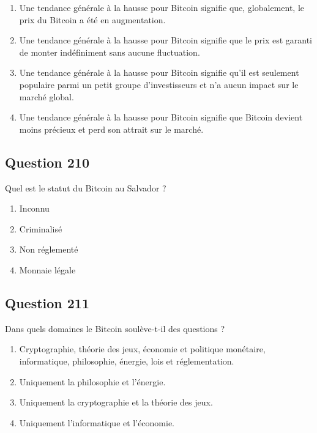 \documentclass[12pt,a4paper]{article}
\begin{document}
\begin{enumerate}[label=\Alph*., leftmargin=*]
\item Une tendance générale à la hausse pour Bitcoin signifie que, globalement, le prix du Bitcoin a été en augmentation.
\item Une tendance générale à la hausse pour Bitcoin signifie que le prix est garanti de monter indéfiniment sans aucune fluctuation.
\item Une tendance générale à la hausse pour Bitcoin signifie qu'il est seulement populaire parmi un petit groupe d'investisseurs et n'a aucun impact sur le marché global.
\item Une tendance générale à la hausse pour Bitcoin signifie que Bitcoin devient moins précieux et perd son attrait sur le marché.
\end{enumerate}

\bigskip


\subsection*{Question 210}
Quel est le statut du Bitcoin au Salvador ?

\begin{enumerate}[label=\Alph*., leftmargin=*]
\item Inconnu
\item Criminalisé
\item Non réglementé
\item Monnaie légale
\end{enumerate}

\bigskip


\subsection*{Question 211}
Dans quels domaines le Bitcoin soulève-t-il des questions ?

\begin{enumerate}[label=\Alph*., leftmargin=*]
\item Cryptographie, théorie des jeux, économie et politique monétaire, informatique, philosophie, énergie, lois et réglementation.
\item Uniquement la philosophie et l'énergie.
\item Uniquement la cryptographie et la théorie des jeux.
\item Uniquement l'informatique et l'économie.
\end{enumerate}
\end{document}
